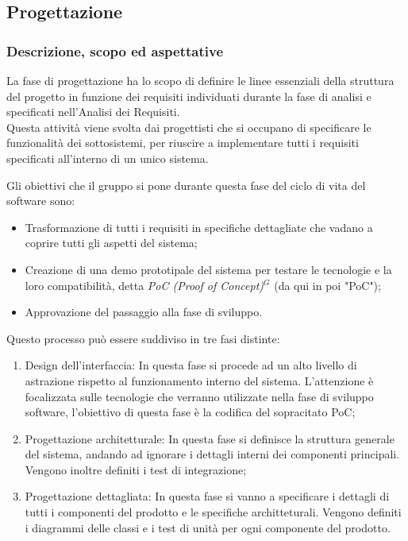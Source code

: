\subsection{Progettazione}

\subsubsection{Descrizione, scopo ed aspettative}
La fase di progettazione ha lo scopo di definire le linee essenziali della struttura del progetto in funzione dei requisiti individuati durante la fase di analisi e specificati nell’Analisi dei Requisiti. \\
Questa attività viene svolta dai progettisti che si occupano di specificare le funzionalità dei sottosistemi, per riuscire a implementare tutti i requisiti specificati all'interno di un unico sistema.

Gli obiettivi che il gruppo si pone durante questa fase del ciclo di vita del software sono:
\begin{itemize}
    \item Trasformazione di tutti i requisiti in specifiche dettagliate che vadano a coprire tutti gli aspetti del sistema;
    \item Creazione di una demo prototipale del sistema per testare le tecnologie e la loro compatibilità, detta \emph{PoC (Proof of Concept)}$^{G}$ (da qui in poi "PoC");
    \item Approvazione del passaggio alla fase di sviluppo.
\end{itemize}

Questo processo può essere suddiviso in tre fasi distinte:
\begin{enumerate}
    \item Design dell'interfaccia: In questa fase si procede ad un alto livello di astrazione rispetto al funzionamento interno del sistema. L'attenzione è focalizzata sulle tecnologie che verranno utilizzate nella fase di sviluppo software, l'obiettivo di questa fase è la codifica del sopracitato PoC;
    \item Progettazione architetturale: In questa fase si definisce la struttura generale del sistema, andando ad ignorare i dettagli interni dei componenti principali. Vengono inoltre definiti i test di integrazione;
    \item Progettazione dettagliata: In questa fase si vanno a specificare i dettagli di tutti i componenti del prodotto e le specifiche architteturali. Vengono definiti i diagrammi delle classi e i test di unità per ogni componente del prodotto.
\end{enumerate}
